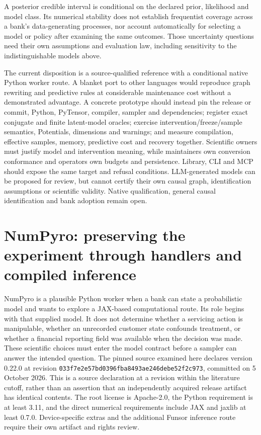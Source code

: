 A posterior credible interval is conditional on the declared prior,
likelihood and model class. Its numerical stability does not establish
frequentist coverage across a bank's data-generating processes, nor account
automatically for selecting a model or policy after examining the same
outcomes. Those uncertainty questions need their own assumptions and evaluation
law, including sensitivity to the indistinguishable models above.
\citep{exec23_pymc_reference}

The current disposition is a source-qualified reference with a conditional
native Python worker route. A blanket port to other languages would reproduce
graph rewriting and predictive rules at considerable maintenance cost without
a demonstrated advantage. A concrete prototype should instead pin the release
or commit, Python, PyTensor, compiler, sampler and dependencies; register exact
conjugate and finite latent-model oracles; exercise intervention/freeze/sample
semantics, Potentials, dimensions and warnings; and measure compilation,
effective samples, memory, predictive cost and recovery together. Scientific
owners must justify model and intervention meaning, while maintainers own
conversion conformance and operators own budgets and persistence. Library,
CLI and MCP should expose the same target and refusal conditions. LLM-generated
models can be proposed for review, but cannot certify their own causal graph,
identification assumptions or scientific validity. Native qualification,
general causal identification and bank adoption remain open.
\citep{exec23_pymc_sources,exec23_pymc_reference}


\section{NumPyro: preserving the experiment through handlers and compiled inference}
\label{sec:exec23-numpyro-worker}

NumPyro is a plausible Python worker when a bank can state a probabilistic model and wants to explore a JAX-based computational route. Its role begins with that supplied model. It does not determine whether a servicing action is manipulable, whether an unrecorded customer state confounds treatment, or whether a financial reporting field was available when the decision was made. These scientific choices must enter the model contract before a sampler can answer the intended question. The pinned source examined here declares version 0.22.0 at revision \texttt{033f7e2e57bd0396fba8493ae246debe52f2c973}, committed on 5 October 2026. This is a source declaration at a revision within the literature cutoff, rather than an assertion that an independently acquired release artifact has identical contents. The root license is Apache-2.0, the Python requirement is at least 3.11, and the direct numerical requirements include JAX and jaxlib at least 0.7.0. Device-specific extras and the additional Funsor inference route require their own artifact and rights review. \cite{exec23_numpyro_sources}

